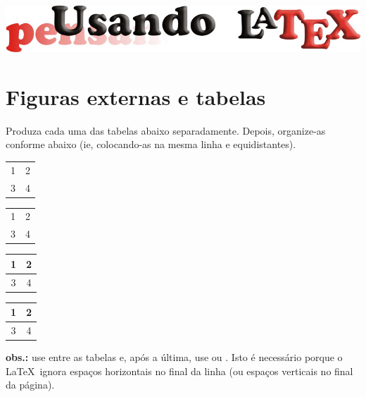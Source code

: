 \documentclass[a4paper,10pt,twocolumn,landscape]{article}
\begin{document}
	\begin{center}\includegraphics[width=0.8\columnwidth]{../figuras/LogotipoCursoLaTeX_v2}\end{center}
	
	\section*{Figuras externas e tabelas}

	\begin{exercicio}
		Produza cada uma das tabelas abaixo separadamente. Depois, organize-as conforme abaixo (ie, colocando-as na mesma linha e equidistantes).
		
		\medskip
		
		\noindent\hfill
		\begin{tabular}{cc}		
			1 & 2 \\		
			3 & 4 \\
		\end{tabular}\hfill
		\begin{tabular}{|c|c|}
			1 & 2 \\ 
			3 & 4 \\ 
		\end{tabular}\hfill
		\begin{tabular}{cc}
			\hline
			1 & 2 \\ 
			\hline
			3 & 4 \\
			\hline
		\end{tabular}\hfill
		\begin{tabular}{|c|c|}
			\hline
			1 & 2 \\ 
			\hline
			3 & 4 \\ 
			\hline
		\end{tabular}\hfill\null
		
		\medskip
		
		\footnotesize
		\noindent\textbf{obs.:} use  entre as tabelas e, após a última, 
		use  ou . Isto é necessário porque o 
		\LaTeX\ ignora espaços horizontais no final da linha (ou espaços verticais 
		no final da página).
	\end{exercicio}
	
\end{document}
